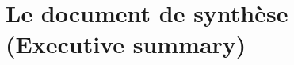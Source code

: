 \documentclass[a4paper,12pt]{report}
\begin{document}
\section{Le document de synthèse (Executive summary)}
\end{document}
